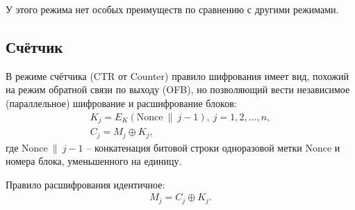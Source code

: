 У этого режима нет особых преимуществ по сравнению с другими режимами.


\subsection{Счётчик}

В режиме счётчика (CTR от Counter) правило шифрования имеет вид, похожий на режим обратной связи по выходу (OFB), но позволяющий вести независимое (параллельное) шифрование и расшифрование блоков:
\[ \begin{array}{l}
    K_j = E_K(\textrm{Nonce} ~\|~ j - 1), ~ j = 1, 2, \dots, n, \\
    C_j = M_j \oplus K_j,
\end{array} \]
где $\textrm{Nonce} ~\|~ j - 1$ -- конкатенация битовой строки одноразовой метки $\textrm{Nonce}$ и номера блока, уменьшенного на единицу.

Правило расшифрования идентичное:
\[ \begin{array}{l}
    M_j = C_j \oplus K_j. \\
\end{array} \]

